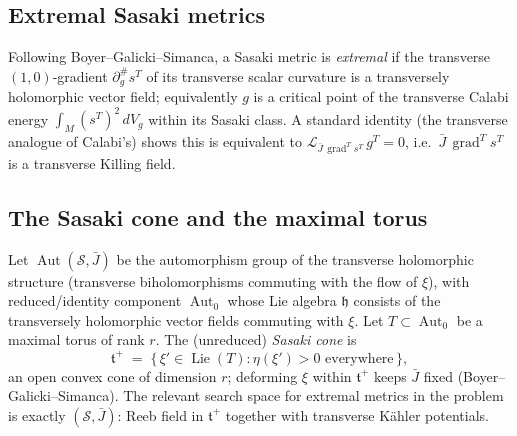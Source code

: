 \documentclass{amsart}
\theoremstyle{definition}
\DeclareMathOperator{\Aut}{Aut}
\DeclareMathOperator{\Lie}{Lie}
\DeclareMathOperator{\grad}{grad}
\begin{document}
\subsection{Extremal Sasaki metrics}
Following Boyer--Galicki--Simanca, a Sasaki metric is \emph{extremal} if the
transverse $(1,0)$-gradient $\partial^\#_g s^T$ of its transverse scalar
curvature is a transversely holomorphic vector field; equivalently $g$ is a
critical point of the transverse Calabi energy $\int_M (s^T)^2\,dV_g$ within
its Sasaki class. A standard identity (the transverse analogue of Calabi's)
shows this is equivalent to $\mathcal L_{\bar J\,\grad^T s^T}\,g^T=0$, i.e.\
$\bar J\,\grad^T s^T$ is a transverse Killing field.

\subsection{The Sasaki cone and the maximal torus}
Let $\Aut(\mathcal S,\bar J)$ be the automorphism group of the transverse
holomorphic structure (transverse biholomorphisms commuting with the flow of
$\xi$), with reduced/identity component $\Aut_0$ whose Lie algebra
$\mathfrak h$ consists of the transversely holomorphic vector fields commuting
with $\xi$. Let $T\subset\Aut_0$ be a maximal torus of rank $r$. The
(unreduced) \emph{Sasaki cone} is
\[
  \mathfrak t^+ \;=\; \{\,\xi'\in\Lie(T) : \eta(\xi')>0 \text{ everywhere}\,\},
\]
an open convex cone of dimension $r$; deforming $\xi$ within $\mathfrak t^+$
keeps $\bar J$ fixed (Boyer--Galicki--Simanca). The relevant search space for
extremal metrics in the problem is exactly $(\mathcal S,\bar J)$: Reeb field in
$\mathfrak t^+$ together with transverse K\"ahler potentials.
\end{document}
